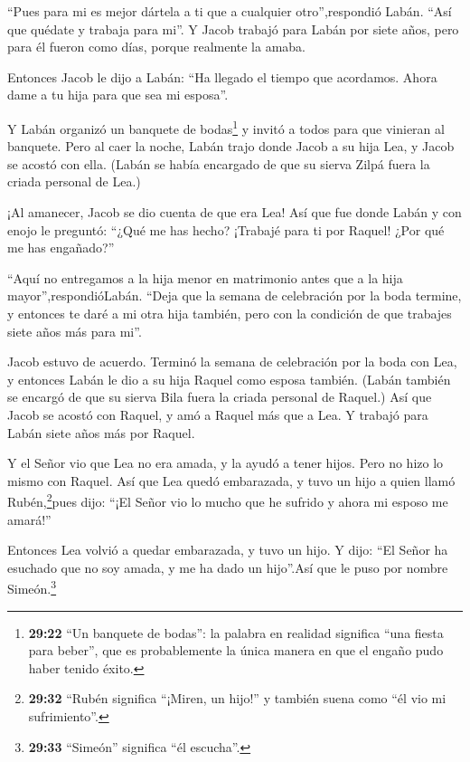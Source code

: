  ``Pues para mi es mejor dártela a ti que a cualquier
otro'',respondió Labán. ``Así que quédate y trabaja para mi''.
 Y Jacob trabajó para Labán por siete años, pero para él
fueron como días, porque realmente la amaba.

 Entonces Jacob le dijo a Labán: ``Ha llegado el tiempo que
acordamos. Ahora dame a tu hija para que sea mi esposa''.

 Y Labán organizó un banquete de bodas\footnote{\textbf{29:22}
  ``Un banquete de bodas'': la palabra en realidad significa ``una
  fiesta para beber'', que es probablemente la única manera en que el
  engaño pudo haber tenido éxito.} y invitó a todos para que vinieran al
banquete.  Pero al caer la noche, Labán trajo donde Jacob a
su hija Lea, y Jacob se acostó con ella.  (Labán se había
encargado de que su sierva Zilpá fuera la criada personal de Lea.)

 ¡Al amanecer, Jacob se dio cuenta de que era Lea! Así que
fue donde Labán y con enojo le preguntó: ``¿Qué me has hecho? ¡Trabajé
para ti por Raquel! ¿Por qué me has engañado?''

 ``Aquí no entregamos a la hija menor en matrimonio antes
que a la hija mayor'',respondióLabán.  ``Deja que la semana
de celebración por la boda termine, y entonces te daré a mi otra hija
también, pero con la condición de que trabajes siete años más para mi''.

 Jacob estuvo de acuerdo. Terminó la semana de celebración
por la boda con Lea, y entonces Labán le dio a su hija Raquel como
esposa también.  (Labán también se encargó de que su sierva
Bila fuera la criada personal de Raquel.)  Así que Jacob se
acostó con Raquel, y amó a Raquel más que a Lea. Y trabajó para Labán
siete años más por Raquel.

 Y el Señor vio que Lea no era amada, y la ayudó a tener
hijos. Pero no hizo lo mismo con Raquel.  Así que Lea quedó
embarazada, y tuvo un hijo a quien llamó Rubén,\footnote{\textbf{29:32}
  ``Rubén significa ``¡Miren, un hijo!'' y también suena como ``él vio
  mi sufrimiento''.}pues dijo: ``¡El Señor vio lo mucho que he sufrido y
ahora mi esposo me amará!''

 Entonces Lea volvió a quedar embarazada, y tuvo un hijo. Y
dijo: ``El Señor ha esuchado que no soy amada, y me ha dado un
hijo''.Así que le puso por nombre Simeón.\footnote{\textbf{29:33}
  ``Simeón'' significa ``él escucha''.}


